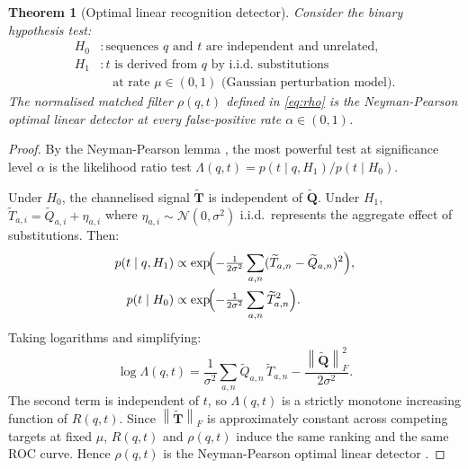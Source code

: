 \documentclass[twocolumn,11pt,a4paper]{article}
\newtheorem{theorem}{Theorem}[section]
\theoremstyle{definition}
\theoremstyle{remark}
\newcommand{\norm}[1]{\left\| #1 \right\|}
\begin{document}
\begin{theorem}[Optimal linear recognition detector]
\label{thm:matched_filter}
Consider the binary hypothesis test:
\begin{align*}
  H_0 &: \text{sequences } q \text{ and } t \text{ are independent and unrelated,}\\
  H_1 &: t \text{ is derived from } q \text{ by i.i.d.\ substitutions}\\
      &\quad\text{at rate } \mu \in (0,1) \text{ (Gaussian perturbation model).}
\end{align*}
The normalised matched filter $\rho(q,t)$ defined in \eqref{eq:rho} is the
Neyman-Pearson optimal linear detector at every false-positive rate
$\alpha \in (0,1)$.
\end{theorem}

\begin{proof}
By the Neyman-Pearson lemma \citep{neyman1933}, the most powerful test at
significance level $\alpha$ is the likelihood ratio test
$\Lambda(q,t) = p(t \mid q, H_1) / p(t \mid H_0)$.

Under $H_0$, the channelised signal $\widetilde{\mathbf{T}}$ is independent
of $\widetilde{\mathbf{Q}}$. Under $H_1$,
$\widetilde{T}_{a,i} = \widetilde{Q}_{a,i} + \eta_{a,i}$ where
$\eta_{a,i} \sim \mathcal{N}(0,\sigma^2)$ i.i.d.\ represents the aggregate
effect of substitutions. Then:
\begin{align}
  p(t \mid q, H_1)
    &\propto \exp\!\Bigl(-\tfrac{1}{2\sigma^2}
      \sum_{a,n}(\widetilde{T}_{a,n}-\widetilde{Q}_{a,n})^2\Bigr),
      \nonumber\\
  p(t \mid H_0)
    &\propto \exp\!\Bigl(-\tfrac{1}{2\sigma^2}
      \sum_{a,n}\widetilde{T}_{a,n}^2\Bigr).
  \label{eq:likelihoods}
\end{align}
Taking logarithms and simplifying:
\begin{equation}
  \log\Lambda(q,t)
  = \frac{1}{\sigma^2}\sum_{a,n}\widetilde{Q}_{a,n}\,\widetilde{T}_{a,n}
    - \frac{\norm{\widetilde{\mathbf{Q}}}_F^2}{2\sigma^2}.
  \label{eq:log_lr}
\end{equation}
The second term is independent of $t$, so $\Lambda(q,t)$ is a strictly
monotone increasing function of $R(q,t)$. Since
$\norm{\widetilde{\mathbf{T}}}_F$ is approximately constant across competing
targets at fixed $\mu$, $R(q,t)$ and $\rho(q,t)$ induce the same ranking
and the same ROC curve. Hence $\rho(q,t)$ is the Neyman-Pearson optimal
linear detector \citep{kay1998,vantrees2001,turin1960}.
\end{proof}
\end{document}
